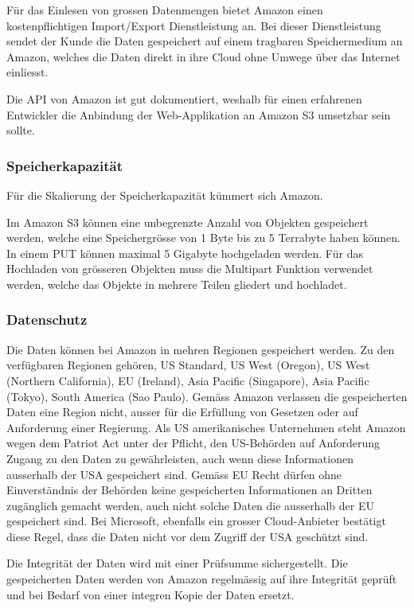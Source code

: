 Für das Einlesen von grossen Datenmengen bietet Amazon einen kostenpflichtigen Import/Export Dienstleistung an. Bei dieser Dienstleistung sendet der Kunde die Daten gespeichert auf einem tragbaren Speichermedium an Amazon, welches die Daten direkt in ihre Cloud ohne Umwege über das Internet einliesst.

Die API von Amazon ist gut dokumentiert, weshalb für einen erfahrenen Entwickler die Anbindung der Web-Applikation an Amazon S3 umsetzbar sein sollte.

\subsubsection*{Speicherkapazität}
Für die Skalierung der Speicherkapazität kümmert sich Amazon.

Im Amazon S3 können eine unbegrenzte Anzahl von Objekten gespeichert werden, welche eine Speichergrösse von 1 Byte bis zu 5 Terrabyte haben können. In einem PUT können maximal 5 Gigabyte hochgeladen werden. Für das Hochladen von grösseren Objekten muss die Multipart Funktion verwendet werden, welche das Objekte in mehrere Teilen gliedert und hochladet.\cite{Amazon2012b}

\subsubsection*{Datenschutz}
Die Daten können bei Amazon in mehren Regionen gespeichert werden. Zu den verfügbaren Regionen gehören, US Standard, US West (Oregon), US West (Northern California), EU (Ireland), Asia Pacific (Singapore), Asia Pacific (Tokyo), South America (Sao Paulo). Gemäss Amazon verlassen die gespeicherten Daten eine Region nicht, ausser für die Erfüllung von Gesetzen oder auf Anforderung einer Regierung. Als US amerikanisches Unternehmen steht Amazon wegen dem Patriot Act unter der Pflicht, den US-Behörden auf Anforderung Zugang zu den Daten zu gewährleisten, auch wenn diese Informationen ausserhalb der USA gespeichert sind. Gemäss EU Recht dürfen ohne Einverständnis der Behörden keine gespeicherten Informationen an Dritten zugänglich gemacht werden, auch nicht solche Daten die ausserhalb der EU gespeichert sind. Bei Microsoft, ebenfalls ein grosser Cloud-Anbieter bestätigt diese Regel, dass die Daten nicht vor dem Zugriff der USA geschützt sind.\cite{Amazon2012}\cite{Ostler}

Die Integrität der Daten wird mit einer Prüfsumme sichergestellt. Die gespeicherten Daten werden von Amazon regelmässig auf ihre Integrität geprüft und bei Bedarf von einer integren Kopie der Daten ersetzt. 

